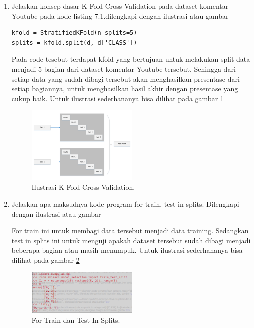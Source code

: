 \begin{enumerate}
\item Jelaskan konsep dasar K Fold Cross Validation pada dataset komentar Youtube pada kode listing 7.1.dilengkapi dengan ilustrasi atau gambar \par
\begin{verbatim}
kfold = StratifiedKFold(n_splits=5)
splits = kfold.split(d, d['CLASS'])
\end{verbatim}
Pada code tesebut terdapat kfold yang bertujuan untuk melakukan split data menjadi 5 bagian dari dataset komentar Youtube tersebut. Sehingga dari setiap data yang sudah dibagi tersebut akan menghasilkan presentase dari setiap bagiannya, untuk menghasilkan hasil akhir dengan presentase yang cukup baik. Untuk ilustrasi sederhananya bisa dilihat pada gambar \ref{toke2}
		\begin{figure}[!htbp]
		\centerline{\includegraphics[width=0.5\textwidth]{figures/im/toke2.png}}
		\caption{Ilustrasi K-Fold Cross Validation.}
		\label{toke2}
		\end{figure}

\item Jelaskan apa maksudnya kode program for train, test in splits. Dilengkapi dengan ilustrasi atau gambar \par
For train ini untuk membagi data tersebut menjadi data training. Sedangkan test in splits ini untuk menguji apakah dataset tersebut sudah dibagi menjadi beberapa bagian atau masih menumpuk. Untuk ilustrasi sederhananya bisa dilihat pada gambar \ref{toke3}
		\begin{figure}[!htbp]
		\centerline{\includegraphics[width=0.5\textwidth]{figures/im/toke3.png}}
		\caption{For Train dan Test In Splits.}
		\label{toke3}
		\end{figure}


\end{enumerate}
